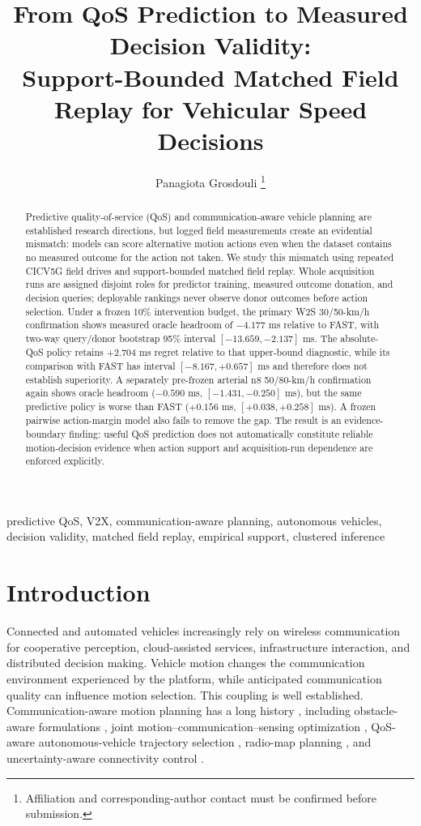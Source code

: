 \documentclass[journal]{IEEEtran}
\title{From QoS Prediction to Measured Decision Validity:\\
Support-Bounded Matched Field Replay for Vehicular Speed Decisions}
\author{Panagiota Grosdouli%
\thanks{Affiliation and corresponding-author contact must be confirmed before submission.}}
\begin{document}
\maketitle

\begin{abstract}
Predictive quality-of-service (QoS) and communication-aware vehicle planning are established research directions, but logged field measurements create an evidential mismatch: models can score alternative motion actions even when the dataset contains no measured outcome for the action not taken. We study this mismatch using repeated CICV5G field drives and support-bounded matched field replay. Whole acquisition runs are assigned disjoint roles for predictor training, measured outcome donation, and decision queries; deployable rankings never observe donor outcomes before action selection. Under a frozen 10\% intervention budget, the primary W2S 30/50-km/h confirmation shows measured oracle headroom of $-4.177$ ms relative to FAST, with two-way query/donor bootstrap 95\% interval $[-13.659,-2.137]$ ms. The absolute-QoS policy retains $+2.704$ ms regret relative to that upper-bound diagnostic, while its comparison with FAST has interval $[-8.167,+0.657]$ ms and therefore does not establish superiority. A separately pre-frozen arterial n8 50/80-km/h confirmation again shows oracle headroom ($-0.590$ ms, $[-1.431,-0.250]$ ms), but the same predictive policy is worse than FAST ($+0.156$ ms, $[+0.038,+0.258]$ ms). A frozen pairwise action-margin model also fails to remove the gap. The result is an evidence-boundary finding: useful QoS prediction does not automatically constitute reliable motion-decision evidence when action support and acquisition-run dependence are enforced explicitly.
\end{abstract}

\begin{IEEEkeywords}
predictive QoS, V2X, communication-aware planning, autonomous vehicles, decision validity, matched field replay, empirical support, clustered inference
\end{IEEEkeywords}

\section{Introduction}
Connected and automated vehicles increasingly rely on wireless communication for cooperative perception, cloud-assisted services, infrastructure interaction, and distributed decision making. Vehicle motion changes the communication environment experienced by the platform, while anticipated communication quality can influence motion selection. This coupling is well established. Communication-aware motion planning has a long history \cite{ghaffarkhah2011,muralidharan2021}, including obstacle-aware formulations \cite{hurst2021}, joint motion--communication--sensing optimization \cite{cai2022}, QoS-aware autonomous-vehicle trajectory selection \cite{ullah2025}, radio-map planning \cite{gordon2026}, and uncertainty-aware connectivity control \cite{kim2026}.
\end{document}
